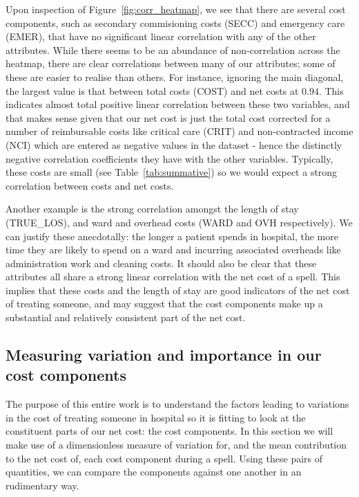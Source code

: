 Upon inspection of Figure~\ref{fig:corr_heatmap}, we see that there are several
cost components, such as secondary commisioning costs (SECC) and emergency care
(EMER), that have no significant linear correlation with any of the other
attributes. While there seems to be an abundance of non-correlation across the
heatmap, there are clear correlations between many of our attributes; some of
these are easier to realise than others. For instance, ignoring the main
diagonal, the largest value is that between total costs (COST) and net costs at
\(0.94\). This indicates almost total positive linear correlation between these
two variables, and that makes sense given that our net cost is just the total
cost corrected for a number of reimbursable costs like critical care (CRIT)
and non-contracted income (NCI) which are entered as negative values in the
dataset \-- hence the distinctly negative correlation coefficients they have
with the other variables. Typically, these costs are small (see
Table~\ref{tab:summative}) so we would expect a strong correlation between costs
and net costs.

Another example is the strong correlation amongst the length of stay
(TRUE\_LOS), and ward and overhead costs (WARD and OVH respectively). We can
justify these anecdotally: the longer a patient spends in hospital, the more
time they are likely to spend on a ward and incurring associated overheads like
administration work and cleaning costs. It should also be clear that these
attributes all share a strong linear correlation with the net cost of a spell.
This implies that these costs and the length of stay are good indicators of the
net cost of treating someone, and may suggest that the cost components make up a
substantial and relatively consistent part of the net cost.

\subsection{Measuring variation and importance in our cost components}

The purpose of this entire work is to understand the factors leading to
variations in the cost of treating someone in hospital so it is fitting to look
at the constituent parts of our net cost: the cost components. In this section
we will make use of a dimensionless measure of variation for, and the mean
contribution to the net cost of, each cost component during a spell. Using these
pairs of quantities, we can compare the components against one another in an
rudimentary way.


